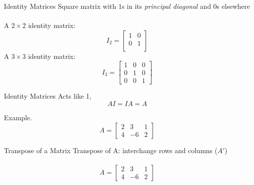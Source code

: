\documentclass{./../../Latex/teaching_slides}
\begin{document}
\begin{frame}{Identity Matrices}
Square matrix with $1$s in its \textit{principal diagonal} and $0$s elsewhere \\~\\
A $2 \times 2$ identity matrix:
$$ I_2 = \begin{bmatrix}
1 & 0\\
0 & 1 \\
\end{bmatrix}$$
A $3 \times 3$ identity matrix:
$$ I_3 = \begin{bmatrix}
1 & 0 & 0 \\
0 & 1 & 0\\
0 & 0 & 1
\end{bmatrix}$$

\end{frame}

\begin{frame}{Identity Matrices}
Acts like 1, 
$$ AI = IA = A $$

\vspace{2em}

Example. 
$$A = \begin{bmatrix}
2 & 3 & 1 \\
4 & -6 & 2
\end{bmatrix}$$
\end{frame}


\begin{frame}{Transpose of a Matrix}
Transpose of A: interchange rows and columns ($A'$) \\~\\
$$A = \begin{bmatrix}
2 & 3 & 1 \\
4 & -6 & 2
\end{bmatrix}$$
\end{frame}

\end{document}
